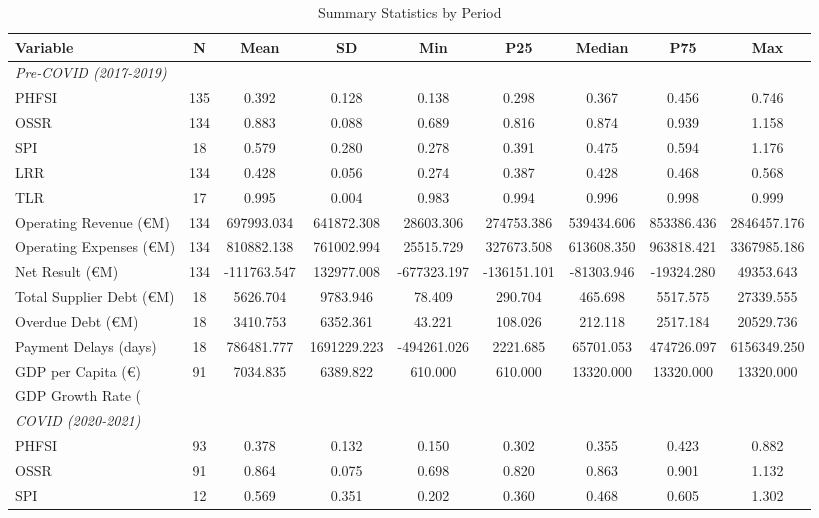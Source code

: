 \begin{table}[htbp]
\centering
\caption{Summary Statistics by Period}
\label{tab:summary_stats}
\begin{tabular}{lcccccccc}
\hline\hline
Variable & N & Mean & SD & Min & P25 & Median & P75 & Max \\
\hline
\multicolumn{9}{l}{\textit{Pre-COVID (2017-2019)}} \\
PHFSI & 135 & 0.392 & 0.128 & 0.138 & 0.298 & 0.367 & 0.456 & 0.746 \\
OSSR & 134 & 0.883 & 0.088 & 0.689 & 0.816 & 0.874 & 0.939 & 1.158 \\
SPI & 18 & 0.579 & 0.280 & 0.278 & 0.391 & 0.475 & 0.594 & 1.176 \\
LRR & 134 & 0.428 & 0.056 & 0.274 & 0.387 & 0.428 & 0.468 & 0.568 \\
TLR & 17 & 0.995 & 0.004 & 0.983 & 0.994 & 0.996 & 0.998 & 0.999 \\
Operating Revenue (€M) & 134 & 697993.034 & 641872.308 & 28603.306 & 274753.386 & 539434.606 & 853386.436 & 2846457.176 \\
Operating Expenses (€M) & 134 & 810882.138 & 761002.994 & 25515.729 & 327673.508 & 613608.350 & 963818.421 & 3367985.186 \\
Net Result (€M) & 134 & -111763.547 & 132977.008 & -677323.197 & -136151.101 & -81303.946 & -19324.280 & 49353.643 \\
Total Supplier Debt (€M) & 18 & 5626.704 & 9783.946 & 78.409 & 290.704 & 465.698 & 5517.575 & 27339.555 \\
Overdue Debt (€M) & 18 & 3410.753 & 6352.361 & 43.221 & 108.026 & 212.118 & 2517.184 & 20529.736 \\
Payment Delays (days) & 18 & 786481.777 & 1691229.223 & -494261.026 & 2221.685 & 65701.053 & 474726.097 & 6156349.250 \\
GDP per Capita (€) & 91 & 7034.835 & 6389.822 & 610.000 & 610.000 & 13320.000 & 13320.000 & 13320.000 \\
GDP Growth Rate (%
\\
\multicolumn{9}{l}{\textit{COVID (2020-2021)}} \\
PHFSI & 93 & 0.378 & 0.132 & 0.150 & 0.302 & 0.355 & 0.423 & 0.882 \\
OSSR & 91 & 0.864 & 0.075 & 0.698 & 0.820 & 0.863 & 0.901 & 1.132 \\
SPI & 12 & 0.569 & 0.351 & 0.202 & 0.360 & 0.468 & 0.605 & 1.302 \\

\end{tabular}
\end{table}
